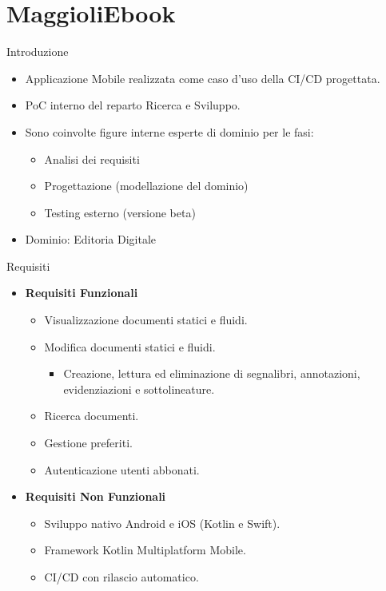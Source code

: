 
\section{MaggioliEbook}
    \begin{frame}{Introduzione}
        \begin{itemize}
            \item Applicazione Mobile realizzata come caso d'uso della CI/CD progettata.
            \item PoC interno del reparto Ricerca e Sviluppo.
            \item Sono coinvolte figure interne esperte di dominio per le fasi:
            \begin{itemize}
                \item Analisi dei requisiti
                \item Progettazione (modellazione del dominio)
                \item Testing esterno (versione beta)
            \end{itemize}
            \item Dominio: Editoria Digitale
        \end{itemize}
    \end{frame}

    \begin{frame}{Requisiti}
        \begin{itemize}
            \item \textbf{Requisiti Funzionali}
            \begin{itemize}
                \item Visualizzazione documenti statici e fluidi.
                \item Modifica documenti statici e fluidi.
                \begin{itemize}
                    \item Creazione, lettura ed eliminazione di segnalibri, annotazioni, evidenziazioni e sottolineature.
                \end{itemize}
                \item Ricerca documenti.
                \item Gestione preferiti.
                \item Autenticazione utenti abbonati.
            \end{itemize}
            \item \textbf{Requisiti Non Funzionali}
            \begin{itemize}
                \item Sviluppo nativo Android e iOS (Kotlin e Swift).
                \item Framework Kotlin Multiplatform Mobile.
                \item CI/CD con rilascio automatico.
            \end{itemize}
        \end{itemize}
    \end{frame}
    
